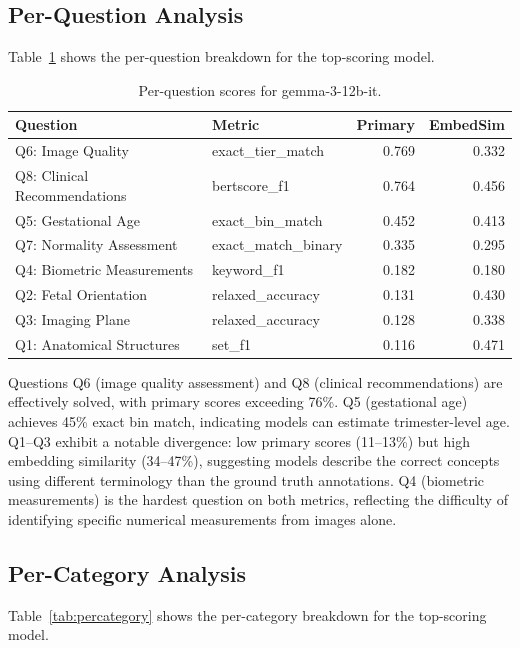 \documentclass[11pt,a4paper]{article}
\begin{document}
\subsection{Per-Question Analysis}

Table~\ref{tab:perquestion} shows the per-question breakdown for the top-scoring model.

\begin{table}[H]
\centering
\caption{Per-question scores for gemma-3-12b-it.}
\label{tab:perquestion}
\begin{tabular}{llrr}
\toprule
\textbf{Question} & \textbf{Metric} & \textbf{Primary} & \textbf{EmbedSim} \\
\midrule
Q6: Image Quality & exact\_tier\_match & 0.769 & 0.332 \\
Q8: Clinical Recommendations & bertscore\_f1 & 0.764 & 0.456 \\
Q5: Gestational Age & exact\_bin\_match & 0.452 & 0.413 \\
Q7: Normality Assessment & exact\_match\_binary & 0.335 & 0.295 \\
Q4: Biometric Measurements & keyword\_f1 & 0.182 & 0.180 \\
Q2: Fetal Orientation & relaxed\_accuracy & 0.131 & 0.430 \\
Q3: Imaging Plane & relaxed\_accuracy & 0.128 & 0.338 \\
Q1: Anatomical Structures & set\_f1 & 0.116 & 0.471 \\
\bottomrule
\end{tabular}
\end{table}

Questions Q6 (image quality assessment) and Q8 (clinical recommendations) are effectively solved, with primary scores exceeding 76\%. Q5 (gestational age) achieves 45\% exact bin match, indicating models can estimate trimester-level age. Q1--Q3 exhibit a notable divergence: low primary scores (11--13\%) but high embedding similarity (34--47\%), suggesting models describe the correct concepts using different terminology than the ground truth annotations. Q4 (biometric measurements) is the hardest question on both metrics, reflecting the difficulty of identifying specific numerical measurements from images alone.

\subsection{Per-Category Analysis}

Table~\ref{tab:percategory} shows the per-category breakdown for the top-scoring model.
\end{document}
